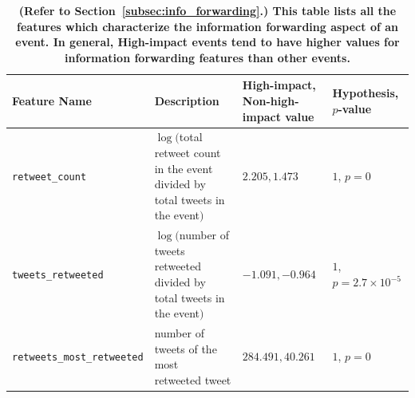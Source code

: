 \documentclass[10pt,letterpaper]{article}
\begin{document}
\begin{table}
  \centering
  {\scriptsize
    \begin{tabular}{llll}
      \toprule
      Feature Name &  \multicolumn{1}{l}{Description} & High-impact, Non-high-impact value & Hypothesis, $p$-value\\
      \midrule
      \texttt{retweet\_count} & \pbox{20cm}{$\log($total retweet count \\in the event divided by total\\ tweets in the event$)$} & $2.205, 1.473$ & $1$, $p = 0$ \\
      \midrule
      \texttt{tweets\_retweeted} & \pbox{20cm}{$\log($number of tweets \\retweeted divided by\\ total tweets in the event$)$} & $-1.091, -0.964$ & $1$, $p = 2.7\times10^{-5}$ \\
      \midrule
      \texttt{retweets\_most\_retweeted} & \pbox{20cm}{number of tweets of the most \\retweeted tweet} & $284.491, 40.261$ & $1$, $p = 0$ \\
      \bottomrule
    \end{tabular}
  }
  \caption{\textbf{(Refer to Section~\ref{subsec:info_forwarding}.) This table lists all the features which characterize the information forwarding aspect of an event.  In general, High-impact events tend to have higher values for information forwarding features than other events.}}
  \label{tab:information_forwarding}
\end{table}
\end{document}

